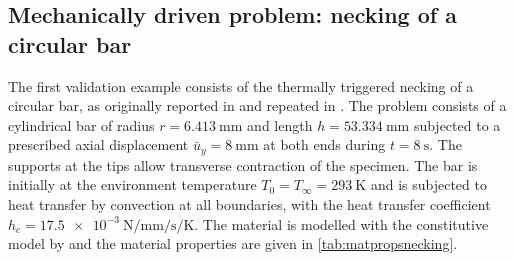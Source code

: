 \subsection{Mechanically driven problem: necking of a circular bar}
\label{sec:mech-driv-probl}

The first validation example consists of the thermally triggered necking of a circular bar, as originally reported in \cite{simo1992AssociativeCoupledThermoplasticity} and repeated in \cite{danowski2014ComputationalModellingThermoStructure}.
The problem consists of a cylindrical bar of radius $r=\SI{6.413}{\milli\meter}$ and length $h=\SI{53.334}{\milli\meter}$ subjected to a prescribed axial displacement $\bar{u}_{y}=\SI{8}{\milli\meter}$ at both ends during $t=\SI{8}{\second}$.
The supports at the tips allow transverse contraction of the specimen.
The bar is initially at the environment temperature $T_{0}=T_{\infty}=\SI{293}{\kelvin}$ and is subjected to heat transfer by convection at all boundaries, with the heat transfer coefficient $h_{c} = \SI{17.5e-3}{\newton\per\milli\meter\per\second\per\kelvin}$.
The material is modelled with the constitutive model by \cite{simo1992AssociativeCoupledThermoplasticity} and the material properties are given in \ref{tab:matpropsnecking}.
%
